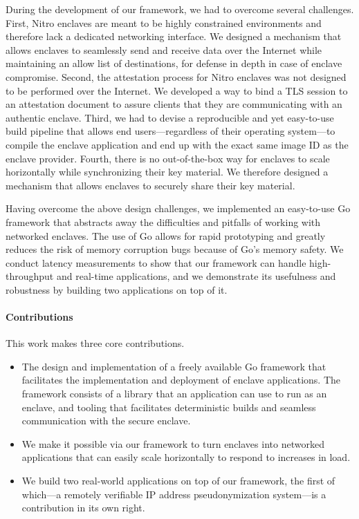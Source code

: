 During the development of our framework, we had to overcome several challenges.
First, Nitro enclaves are meant to be highly constrained environments and
therefore lack a dedicated networking interface.  We designed a mechanism that
allows enclaves to seamlessly send and receive data over the Internet while
maintaining an allow list of destinations, for defense in depth in case of
enclave compromise.
%
Second, the attestation process for Nitro enclaves was not designed to be
performed over the Internet.  We developed a way to bind a TLS session to
an attestation document to assure clients that they are communicating with
an authentic enclave.
%
Third, we had to devise a reproducible and yet easy-to-use build pipeline that
allows end users---regardless of their operating system---to compile the enclave
application and end up with the exact same image ID as the enclave provider.
%
Fourth, there is no out-of-the-box way for enclaves to scale horizontally while
synchronizing their key material.  We therefore designed a mechanism that allows
enclaves to securely share their key material.

Having overcome the above design challenges, we implemented an easy-to-use Go
framework that abstracts away the difficulties and pitfalls of working with
networked enclaves.  The use of Go allows for rapid prototyping and greatly
reduces the risk of memory corruption bugs because of Go's memory safety.  We
conduct latency measurements to show that our framework can handle
high-throughput and real-time applications, and we demonstrate its usefulness
and robustness by building two applications on top of it.

\paragraph{Contributions}

This work makes three core contributions.

\begin{itemize}
  \item The design and implementation of a freely available Go framework that
    facilitates the implementation and deployment of enclave applications.  The
    framework consists of a library that an application can use to run as an
    enclave, and tooling that facilitates deterministic builds and seamless
    communication with the secure enclave.

  \item We make it possible via our framework to turn enclaves into networked
    applications that can easily scale horizontally to respond to increases in
    load.

  \item We build two real-world applications on top of our framework, the first
    of which---a remotely verifiable IP address pseudonymization system---is a
    contribution in its own right.
\end{itemize}

